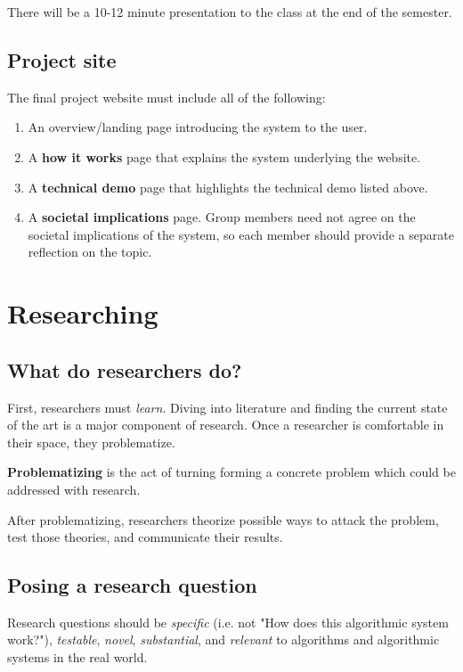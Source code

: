 \documentclass[titlepage, 12pt, leqno]{article}
\begin{document}
\begin{note}
    There will be a 10-12 minute presentation to the class at the end of the
    semester.
\end{note}

\subsection{Project site}

The final project website must include all of the following:
\begin{enumerate}
    \item An overview/landing page introducing the system to the user.
    \item A \textbf{how it works} page that explains the system underlying the
        website.
    \item A \textbf{technical demo} page that highlights the technical demo
        listed above.
    \item A \textbf{societal implications} page. Group members need not agree on
        the societal implications of the system, so each member should provide a
        separate reflection on the topic.
\end{enumerate}

\pagebreak
\section{Researching}
\subsection{What do researchers do?}
First, researchers must \textit{learn}. Diving into literature and finding the
current state of the art is a major component of research. Once a researcher is
comfortable in their space, they problematize.
\begin{definition}
    \textbf{Problematizing} is the act of turning forming a concrete problem which
    could be addressed with research.
\end{definition}
After problematizing, researchers theorize possible ways to attack the problem,
test those theories, and communicate their results.

\subsection{Posing a research question}
Research questions should be \textit{specific} (i.e. not "How does this 
algorithmic system work?"), \textit{testable}, \textit{novel}, 
\textit{substantial}, and \textit{relevant} to algorithms and algorithmic
systems in the real world.
\end{document}
